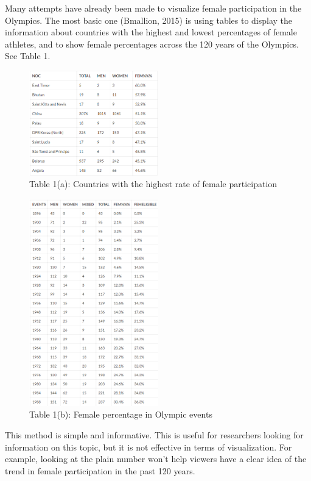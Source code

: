 \documentclass[
]{article}
\begin{document}
Many attempts have already been made to visualize female participation in the Olympics. The most basic one (Bmallion, 2015) is using tables to display the information about countries with the highest and lowest percentages of female athletes, and to show female percentages across the 120 years of the Olympics. See Table 1.

\begin{figure}
\centering
\includegraphics[width=0.5\textwidth,height=\textheight]{static/pics/1-1.png}
\caption{Table 1(a): Countries with the highest rate of female participation}
\end{figure}

\begin{figure}
\centering
\includegraphics[width=0.5\textwidth,height=\textheight]{static/pics/1-2.png}
\caption{Table 1(b): Female percentage in Olympic events}
\end{figure}

This method is simple and informative. This is useful for researchers looking for information on this topic, but it is not effective in terms of visualization. For example, looking at the plain number won't help viewers have a clear idea of the trend in female participation in the past 120 years.
\end{document}
